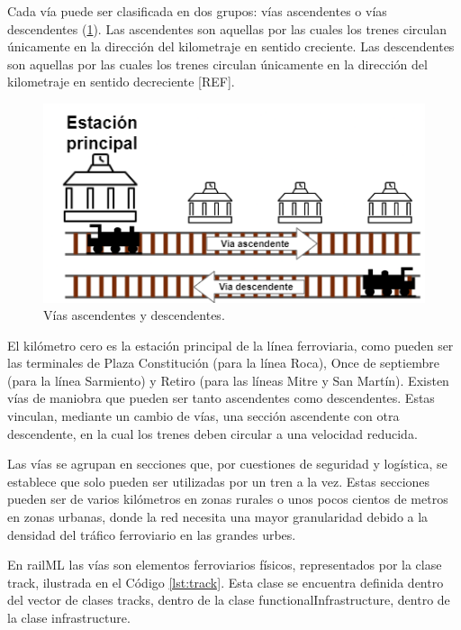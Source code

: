     Cada vía puede ser clasificada en dos grupos: vías ascendentes o vías descendentes (\ref{fig:vias_2}). Las ascendentes son aquellas por las cuales los trenes circulan únicamente en la dirección del kilometraje en sentido creciente. Las descendentes son aquellas por las cuales los trenes circulan únicamente en la dirección del kilometraje en sentido decreciente [REF]. 

    \begin{figure}[!h]
        \centering
        \includegraphics[width=1\textwidth]{Figuras/ascDesc.png}
        \centering\caption{Vías ascendentes y descendentes.}
        \label{fig:vias_2}
    \end{figure}

    El kilómetro cero es la estación principal de la línea ferroviaria, como pueden ser las terminales de Plaza Constitución (para la línea Roca), Once de septiembre (para la línea Sarmiento) y Retiro (para las líneas Mitre y San Martín).  Existen vías de maniobra que pueden ser tanto ascendentes como descendentes. Estas vinculan, mediante un cambio de vías, una sección ascendente con otra descendente, en la cual los trenes deben circular a una velocidad reducida. 

    Las vías se agrupan en secciones que, por cuestiones de seguridad y logística, se establece que solo pueden ser utilizadas por un tren a la vez. Estas secciones pueden ser de varios kilómetros en zonas rurales o unos pocos cientos de metros en zonas urbanas, donde la red necesita una mayor granularidad debido a la densidad del tráfico ferroviario en las grandes urbes.

    En railML las vías son elementos ferroviarios físicos, representados por la clase track, ilustrada en el Código \ref{lst:track}. Esta clase se encuentra definida dentro del vector de clases tracks, dentro de la clase functionalInfrastructure, dentro de la clase infrastructure.

